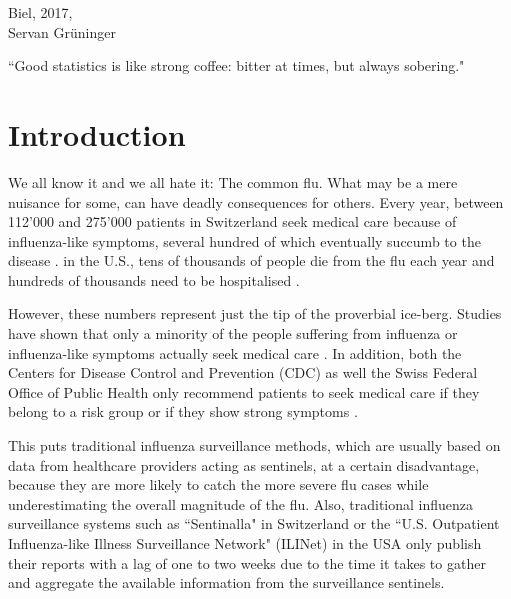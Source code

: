 \documentclass[11pt, a4paper,twoside]{report}\usepackage[]{graphicx}\usepackage[]{color}
\begin{document}
\begin{flushright}
Biel, 2017,\\
Servan Grüninger
\end{flushright}
\vfill

\begin{center}
``Good statistics is like strong coffee: bitter at times, but always sobering."
\end{center}

\thispagestyle{empty}
\cleardoublepage

\tableofcontents
\cleardoublepage


\chapter{Introduction}
\label{ch:intro}
\setcounter{page}{0}
We all know it and we all hate it: The common flu. What may be a mere nuisance for some, can have deadly consequences for others. Every year, between 112'000 and 275'000 patients in Switzerland seek medical care because of influenza-like symptoms, several hundred of which eventually succumb to the disease \citep{bag_lagebericht_2017}. in the U.S., tens of thousands of people die from the flu each year and hundreds of thousands need to be hospitalised \citep{rolfes_estimated_2016}.

However, these numbers represent just the tip of the proverbial ice-berg. Studies have shown that only a minority of the people suffering from influenza or influenza-like symptoms actually seek medical care \citep{goff_surveillance_2015}. In addition, both the Centers for Disease Control and Prevention (CDC) as well the Swiss Federal Office of Public Health only recommend patients to seek medical care if they belong to a risk group or if they show strong symptoms \citep{bag_grippe_2016,cdc_flu_2017}.

This puts traditional influenza surveillance methods, which are usually based on data from healthcare providers acting as sentinels, at a certain disadvantage, because they are more likely to catch the more severe flu cases while underestimating the overall magnitude of the flu. Also, traditional influenza surveillance systems such as ``Sentinalla" in Switzerland \citep{bag_influenza_2017, sentinella_2017} or the ``U.S. Outpatient Influenza-like Illness Surveillance Network" (ILINet) in the USA \citep{cdc_surveillance_2016} only publish their reports with a lag of one to two weeks due to the time it takes to gather and aggregate the available information from the surveillance sentinels.
\end{document}
